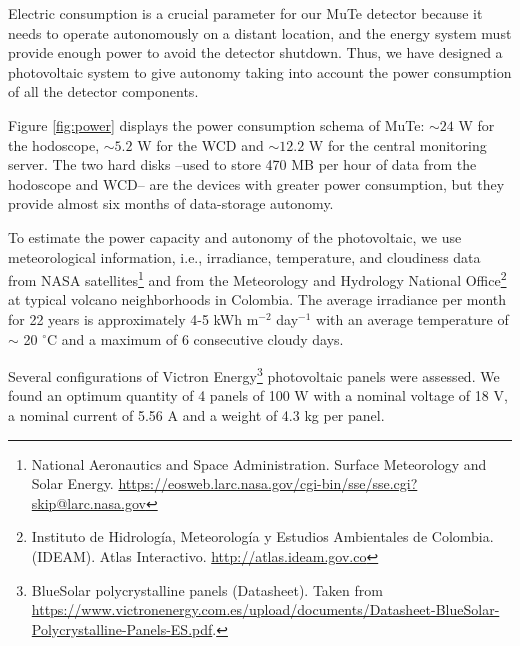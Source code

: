 \documentclass[letterpaper,11pt]{article}
\begin{document}
Electric consumption is a crucial parameter for our MuTe detector because it needs to operate autonomously on a distant location, and the energy system must provide enough power to avoid the detector shutdown. Thus, we have designed a photovoltaic system to give autonomy taking into account the power consumption of all the detector components. 

Figure \ref{fig:power} displays the power consumption schema of MuTe: $\sim 24$ W for the hodoscope,  $\sim 5.2$ W for the WCD  and $\sim 12.2$ W for the central monitoring server. The two hard disks  --used to store 470 MB per hour of data from the hodoscope and WCD-- are the devices with greater power consumption, but they provide almost six months of data-storage autonomy.

To estimate the power capacity and autonomy of the photovoltaic, we use meteorological information, i.e., irradiance, temperature, and cloudiness data from NASA satellites\footnote{National Aeronautics and Space Administration. Surface Meteorology and Solar Energy. \url{https://eosweb.larc.nasa.gov/cgi-bin/sse/sse.cgi?skip@larc.nasa.gov}} and from the Meteorology and Hydrology National Office\footnote{Instituto de Hidrología, Meteorología y Estudios Ambientales de Colombia. (IDEAM). Atlas Interactivo. \url{http://atlas.ideam.gov.co}} at typical volcano neighborhoods in Colombia. The average irradiance per month for 22 years is approximately 4-5 kWh m$^{-2}$ day$^{-1}$ with an average temperature of $\sim$ 20 $^{\circ}$C and a maximum of 6 consecutive cloudy days.

Several configurations of Victron Energy\footnote{BlueSolar polycrystalline panels (Datasheet). Taken from \url{https://www.victronenergy.com.es/upload/documents/Datasheet-BlueSolar-Polycrystalline-Panels-ES.pdf}.} photovoltaic panels were assessed. We found an optimum quantity of 4 panels of 100 W with a nominal voltage of 18 V, a nominal current of 5.56 A and a weight of 4.3 kg per panel.
\end{document}
